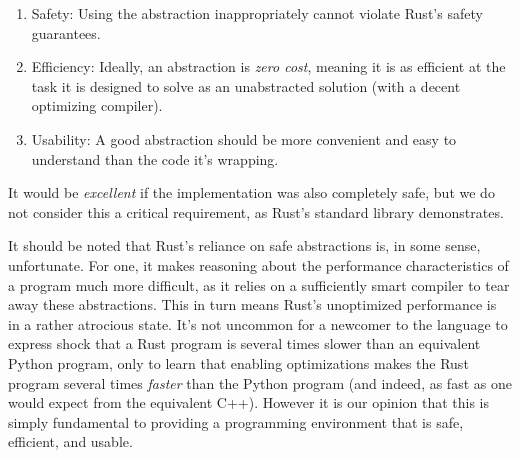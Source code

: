 \begin{enumerate}
 \item Safety: Using the abstraction inappropriately cannot violate Rust's safety guarantees.
 \item Efficiency: Ideally, an abstraction is \emph{zero cost}, meaning it is as efficient
  at the task it is designed to solve as an unabstracted solution (with a decent
  optimizing compiler).
 \item Usability: A good abstraction should be more convenient and easy to understand than
  the code it's wrapping.
\end{enumerate}

It would be \emph{excellent} if the implementation was also completely safe, but we
do not consider this a critical requirement, as Rust's standard library demonstrates.

It should be noted that Rust's reliance on safe abstractions is, in some sense,
unfortunate. For one, it makes reasoning about the performance characteristics
of a program much more difficult, as it relies on a sufficiently
smart compiler to tear away these abstractions. This in turn means Rust's unoptimized
performance is in a rather atrocious state. It's not uncommon for a newcomer to
the language to express shock that a Rust program is several times slower than
an equivalent Python program, only to learn that enabling optimizations makes
the Rust program several times \emph{faster} than the Python program (and indeed,
as fast as one would expect from the equivalent C++).
However it is our opinion that this is simply fundamental to providing a
programming environment that is safe, efficient, and usable.



